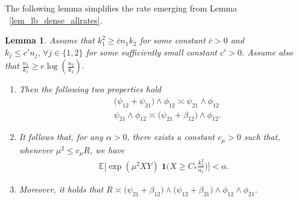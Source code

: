 \documentclass{article}
\newcommand{\EE}{\mathbb{E}}
\newcommand{\one}{\mathbf{1}}
\newcommand{\Ct}{C_{*}}
\newtheorem{lemma}{Lemma}
\begin{document}
The following lemma simplifies the rate emerging from Lemma ~\ref{lem_lb_dense_allrates}.
\begin{lemma}\label{lem_simplify_dense_allrates}
    Assume that $k_1^2 \geq \bar c n_1 k_2$ for some constant $\bar c>0$ and $k_j \leq c' n_j, \,\forall j \in \{1,2\}$ for some sufficiently small constant $c'>0$. 
    Assume also that $\frac{n_1}{k_1} \geq e\log\left(\frac{n_2}{k_2}\right)$. 
    \begin{enumerate}
        \item 
        Then the following two properties hold    
    \begin{align}
        & \Big(\psi_{12} + \psi_{21}\Big) \land \phi_{12}
        \asymp \psi_{21} \land \phi_{12}\label{eq_simplification_dense_case}\\
        & \psi_{21} \land \phi_{12}
        \asymp \Big(\psi_{21} + \beta_{12}\Big) \land \phi_{12}.\label{eq_simplification_dense_case_upper_bound}
    \end{align}
    \item
    It follows that, for any $\alpha>0$, there exists a constant $c_\mu>0$ such that, whenever $\mu^2 \leq c_\mu R$, we have
    \begin{align*}
    \EE\Big[\exp(\mu^2XY)\; \one\Big(X \geq \Ct \frac{k_1^2}{n_1}\Big)\Big] < \alpha.
    \end{align*}
    \item Moreover, it holds that $R \asymp \big(\psi_{21} + \beta_{12}\big) \land \big(\psi_{12} + \beta_{21}\big) \land \phi_{12} \land \phi_{21}$.
    \end{enumerate}
\end{lemma}
\end{document}
